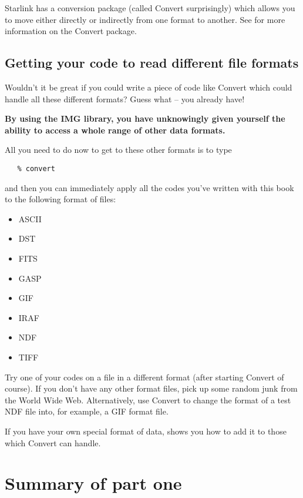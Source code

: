 Starlink has a conversion package (called Convert surprisingly) which 
allows you to move either directly or indirectly from one format to another.
See  for more information on the Convert 
package.

\subsection{Getting your code to read different file formats}

Wouldn't it be great if you could write a piece of code like Convert 
which could handle all these different formats? Guess what -- you already 
have!

{\bf By using the IMG library, you have unknowingly given yourself the 
ability to access a whole range of other data formats.}

\noindent
All you need to do now to get to these other formats is to type

\begin{verbatim}
   % convert
\end{verbatim}

and then you can immediately apply all the codes you've written with this
book to the following format of files:

\begin{itemize}
\item ASCII
\item DST
\item FITS
\item GASP
\item GIF
\item IRAF
\item NDF
\item TIFF
\end{itemize}

Try one of your codes on a file in a different format (after starting
Convert of course). If you don't have any other format files, pick up some
random junk from the World Wide Web. Alternatively, use Convert to change
the format of a test NDF file into, for example, a GIF format file. 

If you have your own special format of data,  
shows you how to add it to those which Convert can handle.

\section{Summary of part one}

